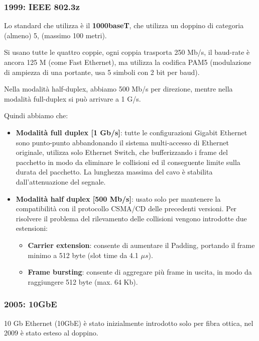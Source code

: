             \subsubsection*{1999: IEEE 802.3z}
            Lo standard che utilizza è il \textbf{1000baseT}, che utilizza un doppino di categoria (almeno) 5, (massimo 100 metri).

            Si usano tutte le quattro coppie, ogni coppia trasporta 250 Mb/s, il baud-rate è ancora 125 M (come Fast Ethernet), ma utilizza la codifica PAM5 (modulazione di ampiezza di una portante, usa 5 simboli con 2 bit per baud).

            Nella modalità half-duplex, abbiamo 500 Mb/s per direzione, mentre nella modalità full-duplex si può arrivare a 1 G/s.

            Quindi abbiamo che:
            \begin{itemize}
                \item \textbf{Modalità full duplex [1 Gb/s]}: tutte le configurazioni Gigabit Ethernet sono punto-punto abbandonando il sistema multi-accesso di Ethernet originale, utilizza solo Ethernet Switch, che bufferizzando i frame del pacchetto in modo da eliminare le collisioni ed il conseguente limite sulla durata del pacchetto. La lunghezza massima del cavo è stabilita dall'attenuazione del segnale.
                \item \textbf{Modalità half duplex [500 Mb/s]}: usato solo per mantenere la compatibilità con il protocollo CSMA/CD delle precedenti versioni.
                Per risolvere il problema del rilevamento delle collisioni vengono introdotte due estensioni:
                \begin{itemize}
                    \item \textbf{Carrier extension}: consente di aumentare il Padding, portando il frame minimo a 512 byte (slot time da 4.1 $\mu s$).
                    \item \textbf{Frame bursting}: consente di aggregare più frame in uscita, in modo da raggiungere 512 byte (max. 64 Kb).
                \end{itemize}
            \end{itemize}

            \subsubsection*{2005: 10GbE}
            10 Gb Ethernet (10GbE) è stato inizialmente introdotto solo per fibra ottica, nel 2009 è stato esteso al doppino.

